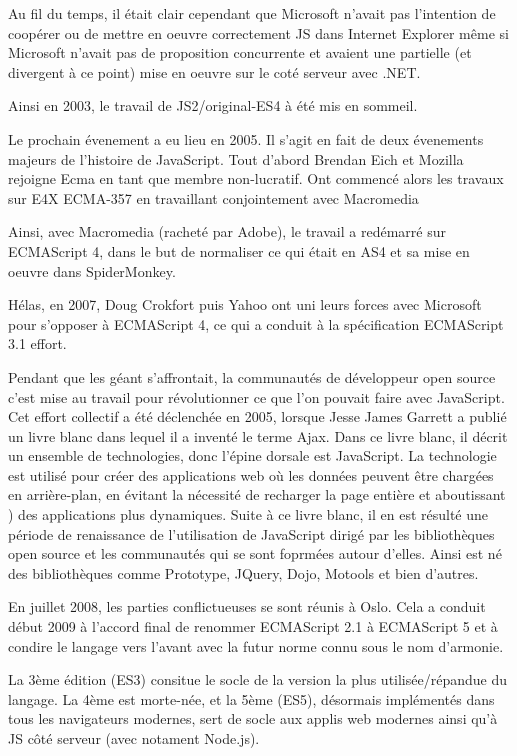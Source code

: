 Au fil du temps, il était clair cependant que Microsoft n’avait pas l’intention de coopérer ou de mettre en oeuvre correctement JS dans Internet Explorer même si Microsoft n’avait pas de proposition concurrente et avaient une partielle (et divergent à ce point) mise en oeuvre sur le coté serveur avec .NET.

Ainsi en 2003, le travail de JS2/original-ES4 à été mis en sommeil.

Le prochain évenement a eu lieu en 2005. Il s’agit en fait de deux évenements majeurs de l’histoire de JavaScript. Tout d’abord Brendan Eich et Mozilla rejoigne Ecma en tant que membre non-lucratif. Ont commencé alors les travaux sur E4X ECMA-357 en travaillant conjointement avec Macromedia

Ainsi, avec Macromedia (racheté par Adobe), le travail a redémarré sur ECMAScript 4, dans le but de normaliser ce qui était en AS4 et sa mise en oeuvre dans SpiderMonkey.

Hélas, en 2007, Doug Crokfort puis Yahoo ont uni leurs forces avec Microsoft pour s’opposer à ECMAScript 4, ce qui a conduit à la spécification ECMAScript 3.1 effort.

Pendant que les géant s’affrontait, la communautés de développeur open source c’est mise au travail pour révolutionner ce que l’on pouvait faire avec JavaScript. Cet effort collectif a été déclenchée en 2005, lorsque Jesse James Garrett a publié un livre blanc dans lequel il a inventé le terme Ajax. Dans ce livre blanc, il décrit un ensemble de technologies, donc l’épine dorsale est JavaScript. La technologie est utilisé pour créer des applications web où les données peuvent être chargées en arrière-plan, en évitant la nécessité de recharger la page entière et aboutissant ) des applications plus dynamiques. Suite à ce livre blanc, il en est résulté une période de renaissance de l’utilisation de JavaScript dirigé par les bibliothèques open source et les communautés qui se sont foprmées autour d’elles. Ainsi est né des bibliothèques comme Prototype, JQuery, Dojo, Motools et bien d’autres.

En juillet 2008, les parties conflictueuses se sont réunis à Oslo. Cela a conduit début 2009 à l’accord final de renommer ECMAScript 2.1 à ECMAScript 5 et à condire le langage vers l’avant avec la futur norme connu sous le nom d’armonie.


La 3ème édition (ES3) consitue le socle de la version la plus utilisée/répandue du langage. La 4ème est morte-née, et la 5ème (ES5), désormais implémentés dans tous les navigateurs modernes, sert de socle aux applis web modernes ainsi qu’à JS côté serveur (avec notament Node.js).

